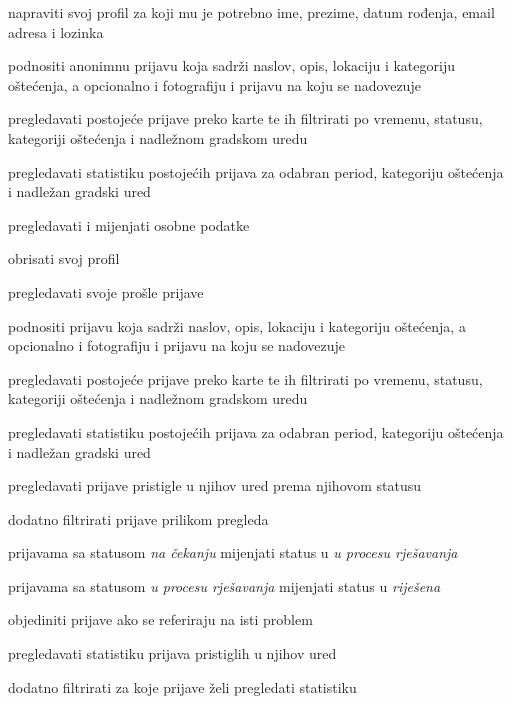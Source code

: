 			\begin{packed_enum}
				
				\item  {}
				\begin{packed_enum}
					\item napraviti svoj profil za koji mu je potrebno ime, prezime, datum rođenja, email adresa i lozinka
					\item podnositi anonimnu prijavu koja sadrži naslov, opis, lokaciju i kategoriju oštećenja, a opcionalno i fotografiju i prijavu na koju se nadovezuje
					\item pregledavati postojeće prijave preko karte te ih filtrirati po vremenu, statusu, kategoriji oštećenja i nadležnom gradskom uredu
					\item pregledavati statistiku postojećih prijava za odabran period, kategoriju oštećenja i nadležan gradski ured			
				\end{packed_enum}
								
				\item  {}				
				\begin{packed_enum}					
					\item pregledavati i mijenjati osobne podatke
					\item obrisati svoj profil
					\item pregledavati svoje prošle prijave
					\item podnositi prijavu koja sadrži naslov, opis, lokaciju i kategoriju oštećenja, a opcionalno i fotografiju i prijavu na koju se nadovezuje
					\item  pregledavati postojeće prijave preko karte te ih filtrirati po vremenu, statusu, kategoriji oštećenja i nadležnom gradskom uredu
					\item pregledavati statistiku postojećih prijava za odabran period, kategoriju oštećenja i nadležan gradski ured
				\end{packed_enum}
				
				\item  {}
				\begin{packed_enum}
					\item pregledavati prijave pristigle u njihov ured prema njihovom statusu
					\item dodatno filtrirati prijave prilikom pregleda
					\item prijavama sa statusom \textit{na čekanju} mijenjati status u \textit{u procesu rješavanja}
					\item prijavama sa statusom \textit{u procesu rješavanja} mijenjati status u \textit{riješena}
					\item objediniti prijave ako se referiraju na isti problem
					\item pregledavati statistiku prijava pristiglih u njihov ured
					\item dodatno filtrirati za koje prijave želi pregledati statistiku
				\end{packed_enum}
				

\end{packed_enum}
